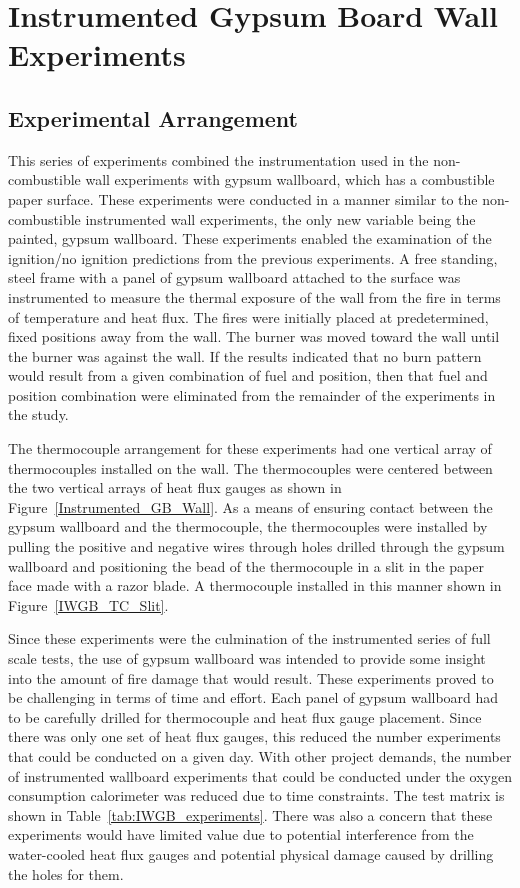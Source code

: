 \documentclass[twoside]{uocthesis}
\begin{document}
{\chapter{Instrumented Gypsum Board Wall Experiments}

\section{Experimental Arrangement}
This series of experiments combined the instrumentation used in the non-combustible wall experiments with gypsum wallboard, which has a combustible paper surface. These experiments were conducted in a manner similar to the non-combustible instrumented wall experiments, the only new variable being the painted, gypsum wallboard. These experiments enabled the examination of the ignition/no ignition predictions from the previous experiments.  A free standing, steel frame with a panel of gypsum wallboard attached to the surface was instrumented to measure the thermal exposure of the wall from the fire in terms of temperature and heat flux.  The fires were initially placed at predetermined, fixed positions away from the wall. The burner was moved toward the wall until the burner was against the wall.  If the results indicated that no burn pattern would result from a given combination of fuel and position, then that fuel and position combination were eliminated from the remainder of the experiments in the study.

The thermocouple arrangement for these experiments had one vertical array of thermocouples installed on the wall.  The thermocouples were centered between the two vertical arrays of heat flux gauges as shown in Figure~\ref{Instrumented_GB_Wall}.  As a means of ensuring contact between the gypsum wallboard and the thermocouple, the thermocouples were installed by pulling the positive and negative wires through holes drilled through the gypsum wallboard and positioning the bead of the thermocouple in a slit in the paper face made with a razor blade.  A thermocouple installed in this manner shown in Figure~\ref{IWGB_TC_Slit}.

Since these experiments were the culmination of the instrumented series of full scale tests, the use of gypsum wallboard was intended to provide some insight into the amount of fire damage that would result. These experiments proved to be challenging in terms of time and effort.  Each panel of gypsum wallboard had to be carefully drilled for thermocouple and heat flux gauge placement. Since there was only one set of heat flux gauges, this reduced the number experiments that could be conducted on a given day.  With other project demands, the number of instrumented wallboard experiments that could be conducted under the oxygen consumption calorimeter was reduced due to time constraints. The test matrix is shown in Table~\ref{tab:IWGB_experiments}. There was also a concern that these experiments would have limited value due to potential interference from the water-cooled heat flux gauges and potential physical damage caused by drilling the holes for them.

}
\end{document}

